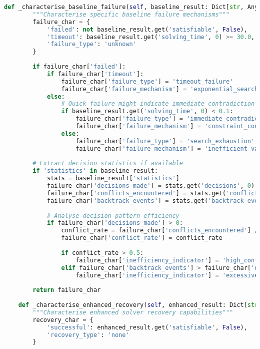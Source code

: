 \begin{lstlisting}[language=Python, caption=Systematic Failure Mode Analysis and Recovery Validation]
    def _characterise_baseline_failure(self, baseline_result: Dict[str, Any]) -> Dict[str, Any]:
        """Characterise specific baseline failure mechanisms"""
        failure_char = {
            'failed': not baseline_result.get('satisfiable', False),
            'timeout': baseline_result.get('solving_time', 0) >= 30.0,
            'failure_type': 'unknown'
        }
        
        if failure_char['failed']:
            if failure_char['timeout']:
                failure_char['failure_type'] = 'timeout_failure'
                failure_char['failure_mechanism'] = 'exponential_search_space_explosion'
            else:
                # Quick failure might indicate immediate contradiction detection
                if baseline_result.get('solving_time', 0) < 0.1:
                    failure_char['failure_type'] = 'immediate_contradiction'
                    failure_char['failure_mechanism'] = 'constraint_conflict'
                else:
                    failure_char['failure_type'] = 'search_exhaustion'
                    failure_char['failure_mechanism'] = 'inefficient_variable_ordering'
        
        # Extract decision statistics if available
        if 'statistics' in baseline_result:
            stats = baseline_result['statistics']
            failure_char['decisions_made'] = stats.get('decisions', 0)
            failure_char['conflicts_encountered'] = stats.get('conflicts', 0)
            failure_char['backtrack_events'] = stats.get('backtrack_events', 0)
            
            # Analyse decision pattern efficiency
            if failure_char['decisions_made'] > 0:
                conflict_rate = failure_char['conflicts_encountered'] / failure_char['decisions_made']
                failure_char['conflict_rate'] = conflict_rate
                
                if conflict_rate > 0.5:
                    failure_char['inefficiency_indicator'] = 'high_conflict_rate'
                elif failure_char['backtrack_events'] > failure_char['decisions_made']:
                    failure_char['inefficiency_indicator'] = 'excessive_backtracking'
        
        return failure_char
    
    def _characterise_enhanced_recovery(self, enhanced_result: Dict[str, Any]) -> Dict[str, Any]:
        """Characterise enhanced solver recovery capabilities"""
        recovery_char = {
            'successful': enhanced_result.get('satisfiable', False),
            'recovery_type': 'none'
        }
        

\end{lstlisting}
